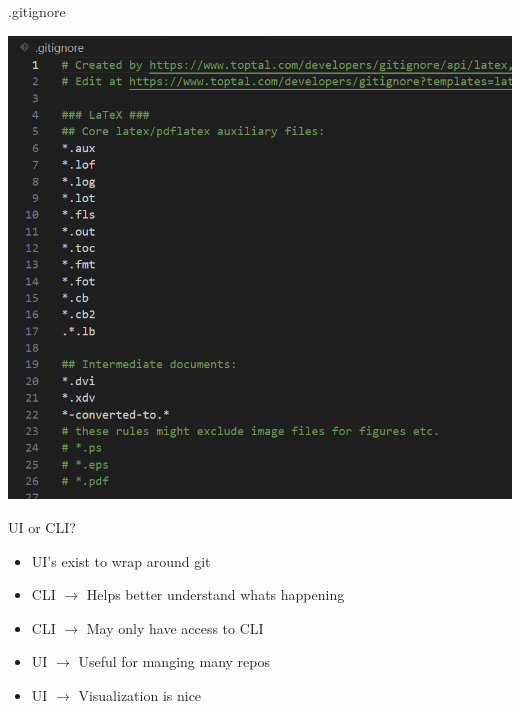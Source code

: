 \documentclass[aspectratio=169]{beamer}
\begin{document}
\begin{frame}{.gitignore}
    \begin{center}
        \includegraphics[scale=.35]{gitignore_talk.png}
    \end{center}
\end{frame}


\begin{frame}{UI or CLI?}
    \begin{itemize}
        \item UI's exist to wrap around git
        \item CLI $\rightarrow$ Helps better understand whats happening
        \item CLI $\rightarrow$ May only have access to CLI
        \item UI $\rightarrow$ Useful for manging many repos
        \item UI $\rightarrow$ Visualization is nice 
    \end{itemize}
\end{frame}
\end{document}
